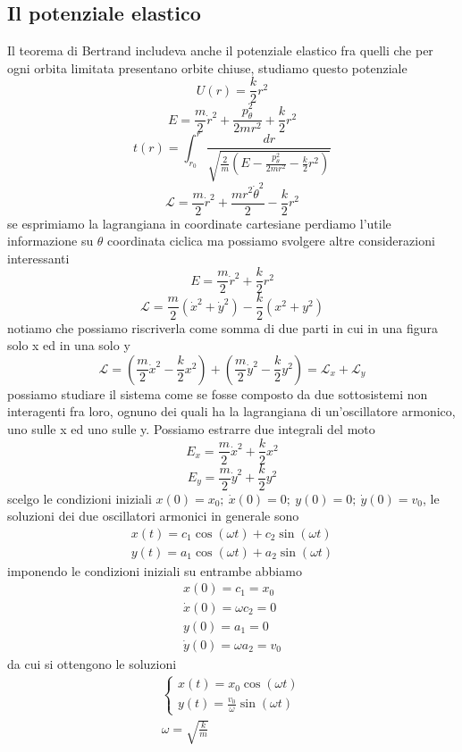 \documentclass[
10pt, %
a4paper, %
oneside, %
headinclude,footinclude, %
BCOR5mm, %
]{scrartcl}
\begin{document}
\subsection{Il potenziale elastico}
Il teorema di Bertrand includeva anche il potenziale elastico fra quelli che per ogni orbita limitata presentano orbite chiuse, studiamo questo potenziale
\[U(r) = \frac{k}{2}r^2\]
\[E = \frac{m}{2}\dot{r}^2+\frac{p^2_\theta}{2mr^2}+\frac{k}{2}r^2\]
\[t(r) = \int_{r_0}^r\frac{dr}{\sqrt{\frac{2}{m}\left(E-\frac{p_\theta^2}{2mr^2}-\frac{k}{2}r^2\right)}}\]
\[\mathcal{L} = \frac{m}{2}\dot{r}^2+\frac{mr^2\dot{\theta}^2}{2}-\frac{k}{2}r^2\]
se esprimiamo la lagrangiana in coordinate cartesiane perdiamo l'utile informazione su $\theta$ coordinata ciclica ma possiamo svolgere altre considerazioni interessanti
\[E= \frac{m}{2}\dot{r}^2+\frac{k}{2}r^2\]
\[\mathcal{L} = \frac{m}{2}(\dot{x}^2+\dot{y}^2)-\frac{k}{2}(x^2+y^2)\]
notiamo che possiamo riscriverla come somma di due parti in cui in una figura solo x ed in una solo y
\[\mathcal{L} = \left(\frac{m}{2}\dot{x}^2-\frac{k}{2}x^2\right)+\left(\frac{m}{2}\dot{y}^2-\frac{k}{2}y^2\right)=\mathcal{L}_x + \mathcal{L}_y \]
possiamo studiare il sistema come se fosse composto da due sottosistemi non interagenti fra loro, ognuno dei quali ha la lagrangiana di un'oscillatore armonico, uno sulle x ed uno sulle y. Possiamo estrarre due integrali del moto
\[E_x = \frac{m}{2}\dot{x}^2+\frac{k}{2}x^2\]
\[E_y = \frac{m}{2}\dot{y}^2+\frac{k}{2}y^2\]
scelgo le condizioni iniziali \(x(0)=x_0;\ \dot{x}(0) = 0;\ y(0) = 0;\ \dot{y}(0) = v_0\), le soluzioni dei due oscillatori armonici in generale sono
\begin{align*}
	x(t) = c_1\cos(\omega t) + c_2\sin(\omega t)\\
	y(t) = a_1\cos(\omega t) + a_2\sin(\omega t)
\end{align*}
imponendo le condizioni iniziali su entrambe abbiamo
\begin{align*}
	x(0) = c_1 = x_0\\
	\dot{x}(0) = \omega c_2 = 0\\
	y(0) = a_1 = 0\\
	\dot{y}(0) = \omega a_2 = v_0
\end{align*}
da cui si ottengono le soluzioni
\begin{align*}
	\begin{cases}
		x(t) = x_0\cos(\omega t)\\
		y(t) = \frac{v_0}{\omega}\sin(\omega t)
	\end{cases}\\
	\omega = \sqrt{\frac{k}{m}}
\end{align*}
\end{document}
